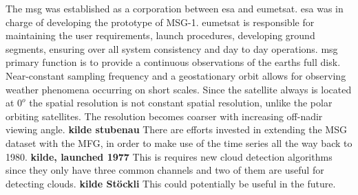 The \acrfull{msg} was established as a corporation between \acrfull{esa} and \acrfull{eumetsat}. \acrshort{esa} was in charge of developing the prototype of MSG-1. \acrshort{eumetsat} is responsible for maintaining the user requirements, launch procedures, developing ground segments, ensuring over all system consistency and day to day operations.  \acrshort{msg} primary function is to provide a continuous observations of the earths full disk. Near-constant sampling frequency and a geostationary orbit allows for observing weather phenomena occurring on short scales. Since the satellite always is located at $0^o$ the spatial resolution is not constant spatial resolution, unlike the polar orbiting satellites. The resolution becomes coarser with increasing off-nadir viewing angle. \textbf{kilde stubenau} There are efforts invested in extending the MSG dataset with the MFG, in order to make use of the time series all the way back to 1980. \textbf{kilde, launched 1977} This is requires new cloud detection algorithms since they only have three common channels and two of them are useful for detecting clouds. \textbf{kilde Stöckli} This could potentially be useful in the future. 

